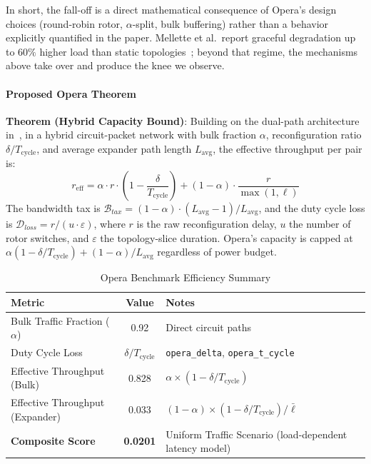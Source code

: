 \documentclass{article}
\begin{document}
    In short, the fall-off is a direct mathematical consequence of Opera's design choices (round-robin rotor, $\alpha$-split, bulk buffering) rather than a behavior explicitly quantified in the paper.  Mellette et al.\ report graceful degradation up to $60\%$ higher load than static topologies~\cite{opera}; beyond that regime, the mechanisms above take over and produce the knee we observe.

    \paragraph{Proposed Opera Theorem}
    \textbf{Theorem (Hybrid Capacity Bound)}: Building on the dual-path architecture in~\cite{opera}, in a hybrid circuit-packet network with bulk fraction $\alpha$, reconfiguration ratio $\delta/T_{\text{cycle}}$, and average expander path length $L_{\text{avg}}$, the effective throughput per pair is:
    \begin{equation}
        r_{\text{eff}} = \alpha \cdot r \cdot \left(1 - \frac{\delta}{T_{\text{cycle}}}\right) + (1-\alpha) \cdot \frac{r}{\max(1, \ell)}
    \end{equation}
    The bandwidth tax is $\mathcal{B}_{tax} = (1-\alpha) \cdot (L_{\text{avg}} - 1)/L_{\text{avg}}$, and the duty cycle loss is $\mathcal{D}_{loss} = r/(u \cdot \varepsilon)$, where $r$ is the raw reconfiguration delay, $u$ the number of rotor switches, and $\varepsilon$ the topology-slice duration. Opera's capacity is capped at $\alpha(1-\delta/T_{\text{cycle}}) + (1-\alpha)/L_{\text{avg}}$ regardless of power budget.

    \begin{table}[H]
        \centering
        \caption{Opera Benchmark Efficiency Summary}
        \begin{tabular}{|l|c|l|}
            \hline
            \textbf{Metric} & \textbf{Value} & \textbf{Notes} \\
            \hline
            Bulk Traffic Fraction ($\alpha$) & 0.92 & Direct circuit paths \\
            Duty Cycle Loss & $\delta/T_{\text{cycle}}$ & \texttt{opera\_delta}, \texttt{opera\_t\_cycle} \\
            Effective Throughput (Bulk) & 0.828 & $\alpha \times (1 - \delta/T_{\text{cycle}})$ \\
            Effective Throughput (Expander) & 0.033 & $(1-\alpha) \times (1 - \delta/T_{\text{cycle}}) / \bar{\ell}$ \\
            \textbf{Composite Score} & \textbf{0.0201} & Uniform Traffic Scenario (load-dependent latency model) \\
            \hline
        \end{tabular}
        \label{tab:opera_efficiency}
    \end{table}
\end{document}
